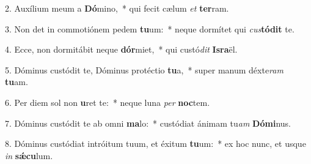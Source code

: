 2. Auxílium meum a \textbf{Dó}mino,~*  qui fecit cælum \textit{et} \textbf{ter}ram.\

3. Non det in commotiónem pedem \textbf{tu}um:~*  neque dormítet qui \textit{cus}\textbf{tó}\textbf{dit} te.\

4. Ecce, non dormitábit neque \textbf{dór}miet,~*  qui custó\textit{dit} \textbf{Is}\textbf{ra}ël.\

5. Dóminus custódit te, Dóminus protéctio \textbf{tu}a,~*  super manum déxte\textit{ram} \textbf{tu}am.\

6. Per diem sol non \textbf{u}ret te:~*  neque luna \textit{per} \textbf{noc}tem.\

7. Dóminus custódit te ab omni \textbf{ma}lo:~*  custódiat ánimam tu\textit{am} \textbf{Dó}\textbf{mi}nus.\

8. Dóminus custódiat intróitum tuum, et éxitum \textbf{tu}um:~*  ex hoc nunc, et usque \textit{in} \textbf{sǽ}\textbf{cu}lum.\

